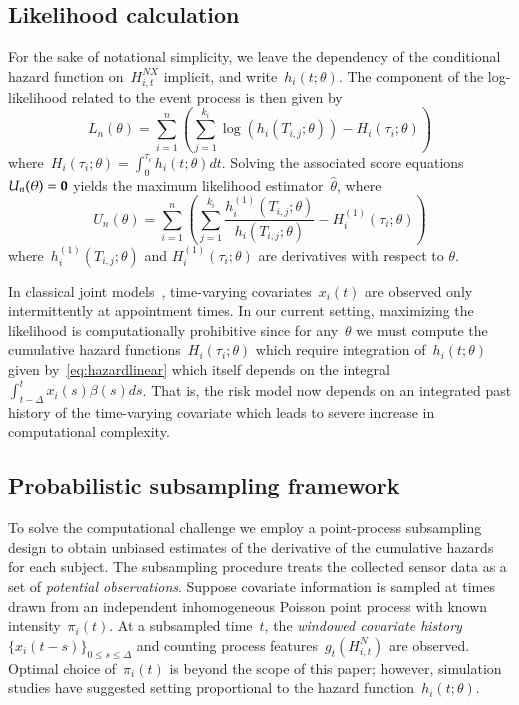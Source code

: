 \documentclass[12pt]{amsart}
\begin{document}
\subsection{Likelihood calculation}  

For the sake of notational simplicity, we leave the dependency of the
conditional hazard function on~$H_{i,t}^{NX}$ implicit, and write~$h_i
(t; \theta)$. The component of the log-likelihood related to the event
process is then given by
\[
  L_n (\theta) = \sum_{i=1}^{n} \left ( \sum_{j=1}^{k_i} 
    \log \left( h_i \left( T_{i,j}; \theta
      \right) \right) - H_{i} \left( \tau_i; \theta \right) \right) 
\]
where~$H_{i} (\tau_i ; \theta) = \int_{0}^{\tau_i} h_{i} (t; \theta)
dt$. Solving the associated score equations~$U_n (\theta) = {\bf 0}$
yields the maximum likelihood estimator~$\hat \theta$, where
\[
U_n (\theta) = \sum_{i=1}^{n} \left ( \sum_{j=1}^{k_i} \frac{h^{(1)}_i
    (T_{i,j}; \theta)}{h_i (T_{i,j}; \theta)} - H^{(1)}_{i} (\tau_i;
  \theta) \right)  
\]
where~$h_i^{(1)} (T_{i,j}; \theta)$ and $H_i^{(1)} (\tau_{i}; \theta)$
are derivatives with respect to $\theta$.

In classical joint models~\citep{Henderson2000, Tsiatis2004},
time-varying covariates~$x_i (t)$ are observed only intermittently at
appointment times. In our current setting, maximizing the likelihood
is computationally prohibitive since for any~$\theta$ we must compute
the cumulative hazard functions~$H_{i} (\tau_i; \theta)$ which require
integration of~$h_i(t;\theta)$ given by~\eqref{eq:hazardlinear} which
itself depends on the integral~$\int_{t-\Delta}^t x_i (s) \beta(s)
ds$.  That is, the risk model now depends on an integrated past
history of the time-varying covariate which leads to severe increase
in computational complexity. 

\subsection{Probabilistic subsampling framework}

To solve the computational challenge we employ a point-process
subsampling design to obtain unbiased estimates of the derivative of
the cumulative hazards for each subject. The subsampling procedure
treats the collected sensor data as a set of \emph{potential
  observations}. Suppose covariate information is sampled at times
drawn from an independent inhomogeneous Poisson point process with
known intensity~$\pi_i (t)$. At a subsampled time~$t$, the
\emph{windowed covariate history} $\{ x_i (t-s)\}_{0 \leq s \leq
  \Delta}$ and counting process features~$g_t (H_{i,t}^N)$ are
observed. Optimal choice of~$\pi_i (t)$ is beyond the scope of this
paper; however, simulation studies have suggested setting proportional
to the hazard function~$h_i (t; \theta)$. 
\end{document}
